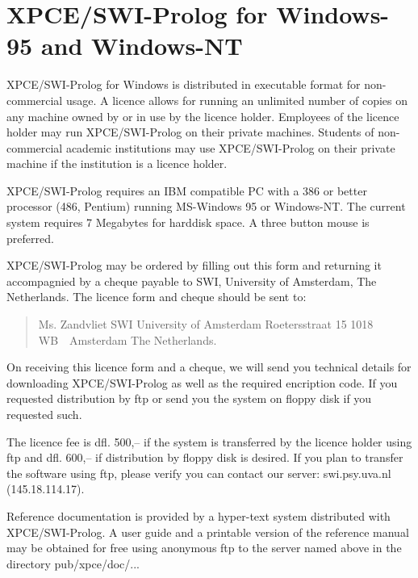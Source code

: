 \setlength{\textwidth}{6in}
\setlength{\textheight}{9in}
\setlength{\oddsidemargin}{1cm}
\setlength{\evensidemargin}{1cm}
\setlength{\parindent}{0in}
\setlength{\parskip}{5pt}
\nofiles


\section*{XPCE/SWI-Prolog for Windows-95 and Windows-NT}

XPCE/SWI-Prolog for Windows is distributed in executable format for
non-commercial usage.  A licence allows for running an unlimited number
of copies on any machine owned by or in use by the licence holder.
Employees of the licence holder may run XPCE/SWI-Prolog on their
private machines.  Students of non-commercial academic institutions
may use XPCE/SWI-Prolog on their private machine if the institution
is a licence holder.

XPCE/SWI-Prolog requires an IBM compatible PC with a 386 or better
processor (486, Pentium) running MS-Windows 95 or Windows-NT. The
current system requires 7 Megabytes for harddisk space.  A three
button mouse is preferred.

XPCE/SWI-Prolog may be ordered by filling out this form and returning it
accompagnied by a cheque payable to SWI, University of Amsterdam, The
Netherlands.  The licence form and cheque should be sent to:

\begin{quote}
{\obeylines\parskip 0pt
 Ms. Zandvliet
 SWI
 University of Amsterdam
 Roetersstraat 15
 1018 WB~~Amsterdam
 The Netherlands.
}
\end{quote}

On receiving this licence form and a cheque, we will send you technical
details for downloading XPCE/SWI-Prolog as well as the required
encription code. If you requested distribution by ftp or send you the
system on floppy disk if you requested such.

The licence fee is dfl.  500,-- if the system is transferred by the
licence holder using ftp and dfl.  600,-- if distribution by floppy
disk is desired.  If you plan to transfer the software using ftp, please
verify you can contact our server: swi.psy.uva.nl (145.18.114.17).

Reference documentation is provided by a hyper-text system distributed
with XPCE/SWI-Prolog.  A user guide and a printable version of the
reference manual may be obtained for free using anonymous ftp to
the server named above in the directory pub/xpce/doc/...

